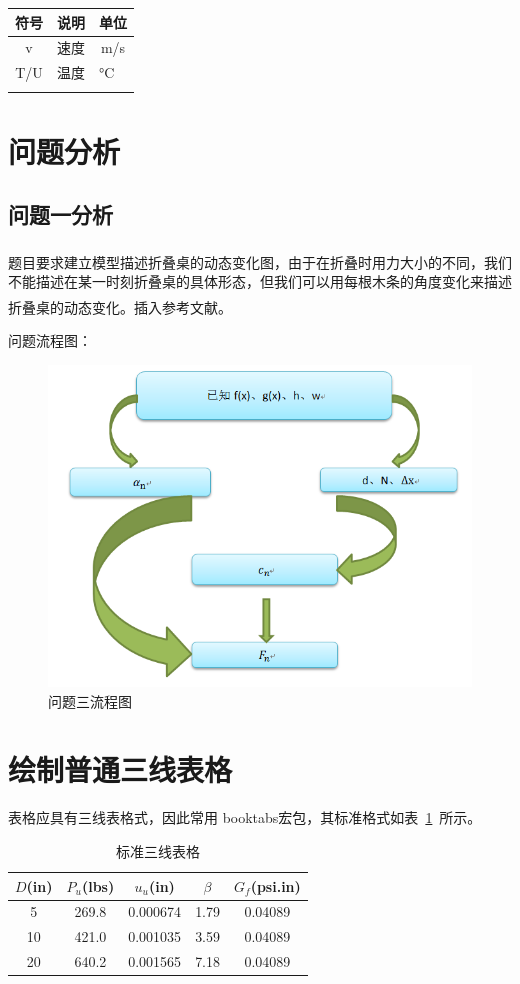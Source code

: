 \documentclass[fontset=windows]{whutmod}
\newcommand{\upcite}[1]{\textsuperscript{\textsuperscript{\cite{#1}}}}
\begin{document}
\begin{center}
	\begin{tabular}{cll}
		\hline
		符号                   & \multicolumn{1}{c}{说明} & \multicolumn{1}{c}{单位}  \\ \hline
		v                    & \multicolumn{1}{c}{速度} & \multicolumn{1}{c}{m/s} \\
		T/U                  & 温度                     & °C                      \\
		\multicolumn{1}{l}{} &                        &                         \\ \hline
	\end{tabular}
\end{center}

\section{问题分析}

\subsection{问题一分析}
题目要求建立模型描述折叠桌的动态变化图\upcite{bib:two}，由于在折叠时用力大小的不同，我们不能描述在某一时刻折叠桌的具体形态，但我们可以用每根木条的角度变化来描述折叠桌的动态变化。插入参考文献\upcite{bib:one}。

问题流程图：
\begin{figure}[!h]
	\centering
	\includegraphics[width=.6\textwidth]{1.png}
	\caption{问题三流程图}
\end{figure}

\section{绘制普通三线表格}
表格应具有三线表格式，因此常用 booktabs宏包，其标准格式如表~\ref{tab001}~所示。
\begin{table}[!htbp]
	\caption{标准三线表格}\label{tab001} \centering
	\begin{tabular}{ccccc}
		\toprule[1.5pt]
		$D$(in) & $P_u$(lbs) & $u_u$(in) & $\beta$ & $G_f$(psi.in)\\
		\midrule[1pt]
		5 & 269.8 & 0.000674 & 1.79 & 0.04089\\
		10 & 421.0 & 0.001035 & 3.59 & 0.04089\\
		20 & 640.2 & 0.001565 & 7.18 & 0.04089\\
		\bottomrule[1.5pt]
	\end{tabular}
\end{table}
\end{document}
